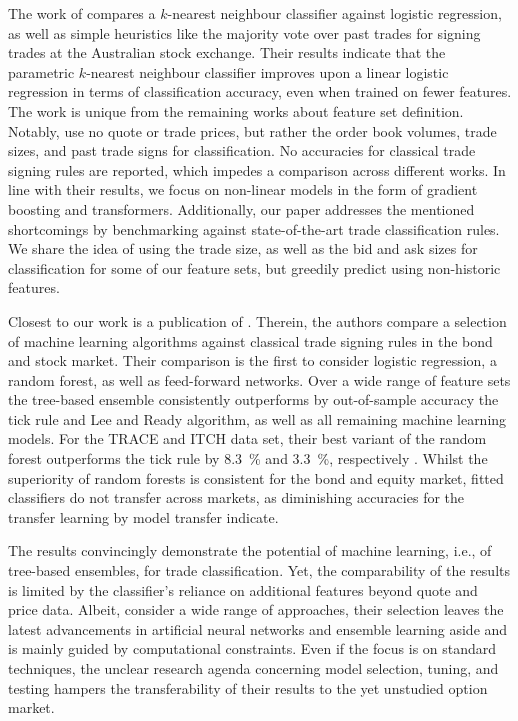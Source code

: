 The work of \textcite[483]{blazejewskiLocalNonParametricModel2005} compares a $k$-nearest neighbour classifier against logistic regression, as well as simple heuristics like the majority vote over past trades for signing trades at the Australian stock exchange. Their results indicate that the parametric $k$-nearest neighbour classifier improves upon a linear logistic regression in terms of classification accuracy, even when trained on fewer features. The work is unique from the remaining works about feature set definition. Notably, \textcite[3]{blazejewskiLocalNonParametricModel2005} use no quote or trade prices, but rather the order book volumes, trade sizes, and past trade signs for classification. No accuracies for classical trade signing rules are reported, which impedes a comparison across different works. In line with their results, we focus on non-linear models in the form of gradient boosting and transformers. Additionally, our paper addresses the mentioned shortcomings by benchmarking against state-of-the-art trade classification rules. We share the idea of using the trade size, as well as the bid and ask sizes for classification for some of our feature sets, but greedily predict using non-historic features.

Closest to our work is a publication of \textcite[1--58]{ronenMachineLearningTrade2022}. Therein, the authors compare a selection of machine learning algorithms against classical trade signing rules in the bond and stock market. Their comparison is the first to consider logistic regression, a random forest, as well as feed-forward networks. Over a wide range of feature sets the tree-based ensemble consistently outperforms by out-of-sample accuracy the tick rule and Lee and Ready algorithm, as well as all remaining machine learning models. For the TRACE and ITCH data set, their best variant of the random forest outperforms the tick rule by \SI{8.3}{\percent} and \SI{3.3}{\percent}, respectively \autocite[57]{ronenMachineLearningTrade2022}. Whilst the superiority of random forests is consistent for the bond and equity market, fitted classifiers do not transfer across markets, as diminishing accuracies for the transfer learning by model transfer indicate.

The results convincingly demonstrate the potential of machine learning, i.e., of tree-based ensembles, for trade classification. Yet, the comparability of the results is limited by the classifier's reliance on additional features beyond quote and price data. Albeit, \textcite[4]{ronenMachineLearningTrade2022} consider a wide range of approaches, their selection leaves the latest advancements in artificial neural networks and ensemble learning aside and is mainly guided by computational constraints. Even if the focus is on standard techniques, the unclear research agenda concerning model selection, tuning, and testing hampers the transferability of their results to the yet unstudied option market.

